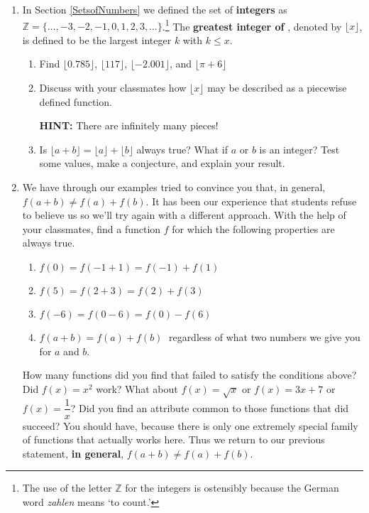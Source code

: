 \begin{enumerate}
\begin{enumerate}
\end{enumerate}


\item  \label{greatestinteger} In Section \ref{SetsofNumbers} we defined the set of \textbf{integers} as  $\mathbb{Z} = \{ \ldots, -3, -2, -1, 0, 1, 2, 3, \ldots\}$.\footnote{The use of the letter $\mathbb{Z}$ for the integers is ostensibly because the German word \textit{zahlen} means `to count.'}  The \textbf{greatest integer of }, denoted by $\lfloor x \rfloor$, is defined to be the largest integer $k$ with $k \leq x$.

\begin{enumerate}

\item  Find $\lfloor 0.785 \rfloor$, $\lfloor 117 \rfloor$, $\lfloor -2.001 \rfloor$, and $\lfloor \pi + 6 \rfloor$

\item  Discuss with your classmates how $\lfloor x \rfloor$ may be described as a piecewise defined function.

\smallskip

\textbf{HINT:}  There are infinitely many pieces!

\item  Is $\lfloor a + b \rfloor = \lfloor a \rfloor + \lfloor b \rfloor$ always true?  What if $a$ or $b$ is an integer?  Test some values, make a conjecture, and explain your result.

\end{enumerate}

\item We have through our examples tried to convince you that, in general, $f(a + b) \neq f(a) + f(b)$.  It has been our experience that students refuse to believe us so we'll try again with a different approach.  With the help of your classmates, find a function $f$ for which the following properties are always true.

\begin{enumerate}

\item $f(0) = f(-1 + 1) = f(-1) + f(1)$
\item $f(5) = f(2 + 3) = f(2) + f(3)$
\item $f(-6) = f(0 - 6) = f(0) - f(6)$
\item $f(a + b) = f(a) + f(b)\;$ regardless of what two numbers we give you for $a$ and  $b$.

\end{enumerate}

How many functions did you find that failed to satisfy the conditions above?  Did $f(x) = x^{2}$ work?  What about $f(x) = \sqrt{x}$ or $f(x) = 3x + 7$ or $f(x) = \dfrac{1}{x}$?  Did you find an attribute common to those functions that did succeed?  You should have, because there is only one extremely special family of functions that actually works here.  Thus we return to our previous statement, {\bf in general}, $f(a + b) \neq f(a) + f(b)$.

\end{enumerate}

